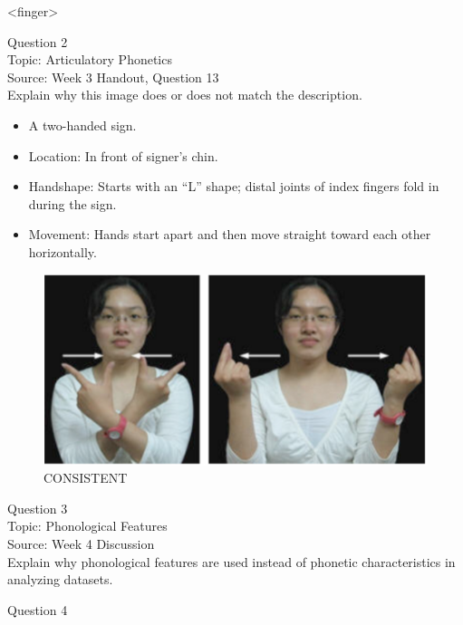 \documentclass[12pt]{article}
\begin{document}
<finger>


\newpage

{\large Question 2}\\

Topic: Articulatory Phonetics\\
Source: Week 3 Handout, Question 13\\

Explain why this image does or does not match the description.\\

\begin{itemize} \item A two-handed sign. \item Location: In front of signer’s chin. \item Handshape: Starts with an “L” shape; distal joints of index fingers fold in during the sign. \item Movement: Hands start apart and then move straight toward each other horizontally. \end{itemize}

\begin{figure}[H]
\includegraphics{../images/taiwansign_consistent.png}
\caption{CONSISTENT}
\end{figure}

\newpage

{\large Question 3}\\

Topic: Phonological Features\\
Source: Week 4 Discussion\\

Explain why phonological features are used instead of phonetic characteristics in analyzing datasets.\\


\newpage

{\large Question 4}\\
\end{document}
